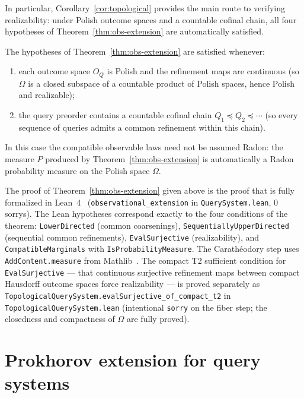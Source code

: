 \begin{corollary}
\label{cor:topological}
In particular, Corollary~\ref{cor:topological} provides the main
route to verifying realizability: under Polish outcome spaces and a
countable cofinal chain, all four hypotheses of
Theorem~\ref{thm:obs-extension} are automatically satisfied.

The hypotheses of Theorem~\ref{thm:obs-extension} are satisfied
whenever:
\begin{enumerate}
\item each outcome space $O_Q$ is Polish and the refinement maps are
      continuous (so $\Omega$ is a closed subspace of a countable
      product of Polish spaces, hence Polish~\cite{Bogachev} and realizable);
\item the query preorder contains a countable cofinal chain
      $Q_1\preceq Q_2\preceq\cdots$ (so every sequence of queries
      admits a common refinement within this chain).
\end{enumerate}
In this case the compatible observable laws need not be assumed Radon:
the measure $P$ produced by Theorem~\ref{thm:obs-extension} is
automatically a Radon probability measure on the Polish space $\Omega$.
\end{corollary}

\begin{remark}
\label{rem:lean-caratheodory}
The proof of Theorem~\ref{thm:obs-extension} given above is the proof
that is fully formalized in Lean~4~\cite{Lean4} (\texttt{observational\_extension}
in \texttt{QuerySystem.lean}, 0 sorrys).
The Lean hypotheses correspond exactly to the four conditions of the
theorem: \texttt{LowerDirected} (common coarsenings),
\texttt{SequentiallyUpperDirected} (sequential common refinements),
\texttt{EvalSurjective} (realizability), and
\texttt{CompatibleMarginals} with \texttt{IsProbabilityMeasure}.
The Carathéodory step uses \texttt{AddContent.measure} from Mathlib~\cite{Mathlib}.
The compact T2 sufficient condition for \texttt{EvalSurjective} ---
that continuous surjective refinement maps between compact Hausdorff outcome spaces
force realizability --- is proved separately as
\texttt{TopologicalQuerySystem.evalSurjective\_of\_compact\_t2}
in \texttt{TopologicalQuerySystem.lean} (intentional \texttt{sorry} on the fiber
step; the closedness and compactness of $\Omega$ are fully proved).
\end{remark}

\section{Prokhorov extension for query systems}
\label{sec:prokhorov}

